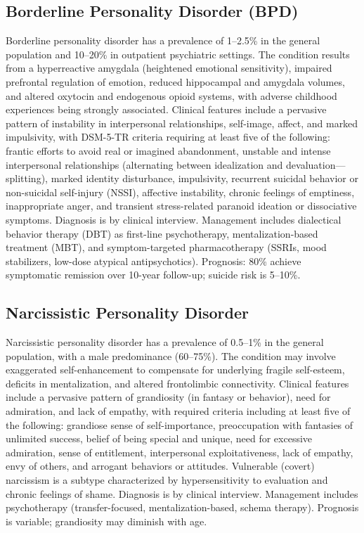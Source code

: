 \subsection{Borderline Personality Disorder (BPD)}
\label{sec:Borderline Personality Disorder (BPD)}
Borderline personality disorder has a prevalence of 1--2.5\% in the general population and 10--20\% in outpatient psychiatric settings. The condition results from a hyperreactive amygdala (heightened emotional sensitivity), impaired prefrontal regulation of emotion, reduced hippocampal and amygdala volumes, and altered oxytocin and endogenous opioid systems, with adverse childhood experiences being strongly associated. Clinical features include a pervasive pattern of instability in interpersonal relationships, self-image, affect, and marked impulsivity, with DSM-5-TR criteria requiring at least five of the following: frantic efforts to avoid real or imagined abandonment, unstable and intense interpersonal relationships (alternating between idealization and devaluation---splitting), marked identity disturbance, impulsivity, recurrent suicidal behavior or non-suicidal self-injury (NSSI), affective instability, chronic feelings of emptiness, inappropriate anger, and transient stress-related paranoid ideation or dissociative symptoms. Diagnosis is by clinical interview. Management includes dialectical behavior therapy (DBT) as first-line psychotherapy, mentalization-based treatment (MBT), and symptom-targeted pharmacotherapy (SSRIs, mood stabilizers, low-dose atypical antipsychotics). Prognosis: 80\% achieve symptomatic remission over 10-year follow-up; suicide risk is 5--10\%.

\subsection{Narcissistic Personality Disorder}
\label{sec:Narcissistic Personality Disorder}
Narcissistic personality disorder has a prevalence of 0.5--1\% in the general population, with a male predominance (60--75\%). The condition may involve exaggerated self-enhancement to compensate for underlying fragile self-esteem, deficits in mentalization, and altered frontolimbic connectivity. Clinical features include a pervasive pattern of grandiosity (in fantasy or behavior), need for admiration, and lack of empathy, with required criteria including at least five of the following: grandiose sense of self-importance, preoccupation with fantasies of unlimited success, belief of being special and unique, need for excessive admiration, sense of entitlement, interpersonal exploitativeness, lack of empathy, envy of others, and arrogant behaviors or attitudes. Vulnerable (covert) narcissism is a subtype characterized by hypersensitivity to evaluation and chronic feelings of shame. Diagnosis is by clinical interview. Management includes psychotherapy (transfer-focused, mentalization-based, schema therapy). Prognosis is variable; grandiosity may diminish with age.

